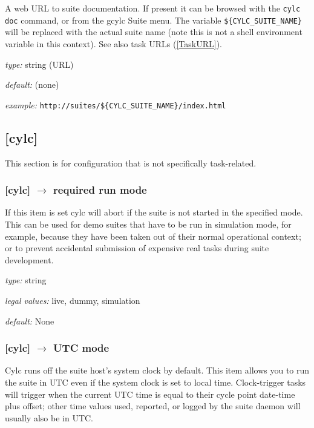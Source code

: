 A web URL to suite documentation.  If present it can be browsed with the
\lstinline=cylc doc= command, or from the gcylc Suite menu.  The variable
\lstinline=${CYLC_SUITE_NAME}= will be replaced with the actual suite name
(note this is not a shell environment variable in this context). See also
task URLs (\ref{TaskURL}).

\begin{myitemize}
\item {\em type:} string (URL)
\item {\em default:} (none)
\item {\em example:} \lstinline=http://suites/${CYLC_SUITE_NAME}/index.html=
\end{myitemize}

\subsection{[cylc]}

This section is for configuration that is not specifically task-related.

\subsubsection[required run mode]{ [cylc] $\rightarrow$ required run mode}

If this item is set cylc will abort if the suite is not started in the
specified mode. This can be used for demo suites that have to be
run in simulation mode, for example, because they have been taken out of
their normal operational context; or to prevent accidental submission of
expensive real tasks during suite development.
\begin{myitemize}
    \item {\em type:} string
    \item {\em legal values:} live, dummy, simulation
    \item {\em default:} None
\end{myitemize}

\subsubsection[UTC mode]{ [cylc] $\rightarrow$ UTC mode}
\label{UTC-mode}

Cylc runs off the suite host's system clock by default. This item allows
you to run the suite in UTC even if the system clock is set to local time.
Clock-trigger tasks will trigger when the current UTC time is equal to
their cycle point date-time plus offset; other time values used, reported,
or logged by the suite daemon will usually also be in UTC.

